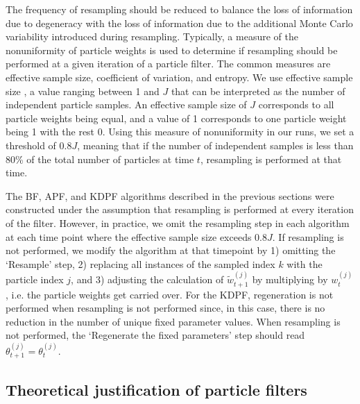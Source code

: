 \documentclass{elsarticle}
\begin{document}
The frequency of resampling should be reduced to balance the loss of information due to degeneracy with the loss of information due to the additional Monte Carlo variability introduced during resampling. Typically, a measure of the nonuniformity of particle weights is used to determine if resampling should be performed at a given iteration of a particle filter. The common measures are effective sample size, coefficient of variation, and entropy. We use effective sample size \citep{Liu:Chen:Wong:reje:1998}, a value ranging between 1 and $J$ that can be interpreted as the number of independent particle samples. An effective sample size of $J$ corresponds to all particle weights being equal, and a value of 1 corresponds to one particle weight being 1 with the rest 0. Using this measure of nonuniformity in our runs, we set a threshold of $0.8J$, meaning that if the number of independent samples is less than 80\% of the total number of particles at time $t$, resampling is performed at that time.

The BF, APF, and KDPF algorithms described in the previous sections were constructed under the assumption that resampling is performed at every iteration of the filter. However, in practice, we omit the resampling step in each algorithm at each time point where the effective sample size exceeds $0.8J$. If resampling is not performed, we modify the algorithm at that timepoint by 1) omitting the `Resample' step, 2) replacing all instances of the sampled index $k$ with the particle index $j$, and 3) adjusting the calculation of $\tilde{w}_{t+1}^{(j)}$ by multiplying by $w_t^{(j)}$, i.e. the particle weights get carried over. For the KDPF, regeneration is not performed when resampling is not performed since, in this case, there is no reduction in the number of unique fixed parameter values. When resampling is not performed, the `Regenerate the fixed parameters' step should read $\theta_{t+1}^{(j)} = \theta_t^{(j)}$.

\subsection{Theoretical justification of particle filters}
\end{document}
